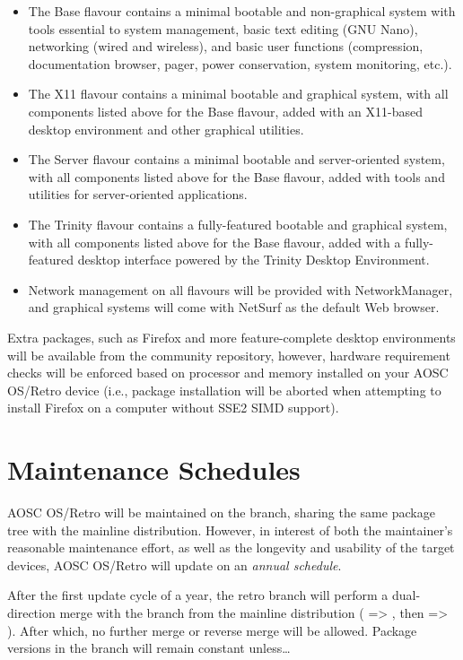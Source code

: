 \documentclass[a5paper,twosided,11pt]{book}
\begin{document}
    \begin{itemize}
        \item The Base flavour contains a minimal bootable and non-graphical system with tools essential to system management, basic text editing (GNU Nano), networking (wired and wireless), and basic user functions (compression, documentation browser, pager, power conservation, system monitoring, etc.).
        \item The X11 flavour contains a minimal bootable and graphical system, with all components listed above for the Base flavour, added with an X11-based desktop environment and other graphical utilities.
        \item The Server flavour contains a minimal bootable and server-oriented system, with all components listed above for the Base flavour, added with tools and utilities for server-oriented applications.
        \item The Trinity flavour contains a fully-featured bootable and graphical system, with all components listed above for the Base flavour, added with a fully-featured desktop interface powered by the Trinity Desktop Environment.
        \item Network management on all flavours will be provided with NetworkManager, and graphical systems will come with NetSurf as the default Web browser.
    \end{itemize}

    Extra packages, such as Firefox and more feature-complete desktop environments will be available from the community repository, however, hardware requirement checks will be enforced based on processor and memory installed on your AOSC OS/Retro device (i.e., package installation will be aborted when attempting to install Firefox on a computer without SSE2 SIMD support).

    \section{Maintenance Schedules}

    AOSC OS/Retro will be maintained on the  branch,
    sharing the same package tree with the mainline distribution.
    However, in interest of both the maintainer's reasonable maintenance effort,
    as well as the longevity and usability of the target devices,
    AOSC OS/Retro will update on an \textit{annual schedule}.

    After the first update cycle of a year, the retro branch will perform a dual-direction
    merge with the  branch from the mainline distribution ( => , then  => ).
    After which, no further merge or reverse merge will be allowed.
    Package versions in the  branch will remain constant unless\ldots
\end{document}
